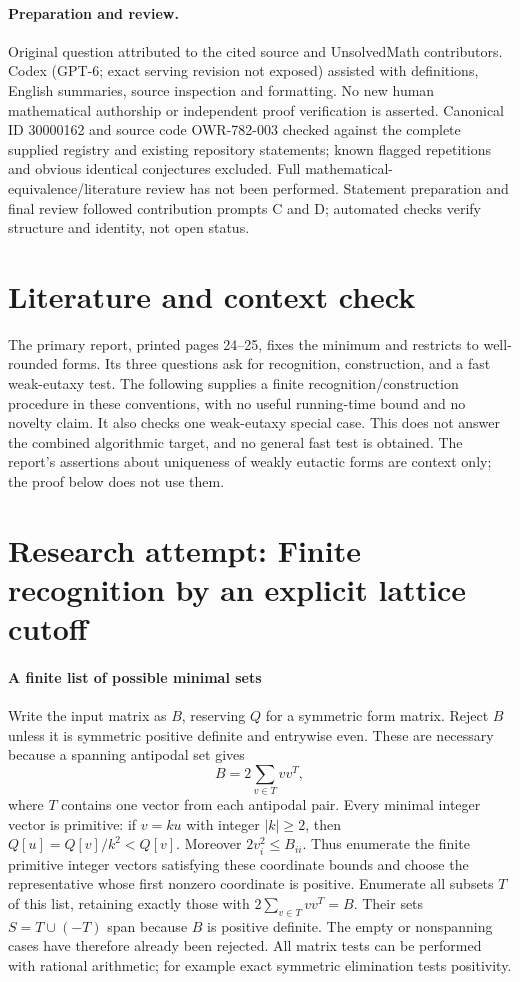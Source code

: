 \documentclass[11pt]{article}
\begin{document}
\paragraph{Preparation and review.}
Original question attributed to the cited source and UnsolvedMath contributors. Codex (GPT-6; exact serving revision not exposed) assisted with definitions, English summaries, source inspection and formatting. No new human mathematical authorship or independent proof verification is asserted. Canonical ID 30000162 and source code OWR-782-003 checked against the complete supplied registry and existing repository statements; known flagged repetitions and obvious identical conjectures excluded. Full mathematical-equivalence/literature review has not been performed. Statement preparation and final review followed contribution prompts C and D; automated checks verify structure and identity, not open status.
\label{end:30000162}

\section{Literature and context check}
The primary report, printed pages 24--25, fixes the minimum and restricts to well-rounded forms. Its three questions ask for recognition, construction, and a fast weak-eutaxy test. The following supplies a finite recognition/construction procedure in these conventions, with no useful running-time bound and no novelty claim. It also checks one weak-eutaxy special case. This does not answer the combined algorithmic target, and no general fast test is obtained. The report's assertions about uniqueness of weakly eutactic forms are context only; the proof below does not use them.
\section{Research attempt: Finite recognition by an explicit lattice cutoff}

\paragraph{A finite list of possible minimal sets}
Write the input matrix as $B$, reserving $Q$ for a symmetric form matrix. Reject $B$ unless it is symmetric positive definite and entrywise even. These are necessary because a spanning antipodal set gives
\[
 B=2\sum_{v\in T}vv^T,
\]
where $T$ contains one vector from each antipodal pair. Every minimal integer vector is primitive: if $v=ku$ with integer $|k|\geq2$, then $Q[u]=Q[v]/k^2<Q[v]$. Moreover $2v_i^2\leq B_{ii}$. Thus enumerate the finite primitive integer vectors satisfying these coordinate bounds and choose the representative whose first nonzero coordinate is positive. Enumerate all subsets $T$ of this list, retaining exactly those with $2\sum_{v\in T}vv^T=B$. Their sets $S=T\cup(-T)$ span because $B$ is positive definite. The empty or nonspanning cases have therefore already been rejected. All matrix tests can be performed with rational arithmetic; for example exact symmetric elimination tests positivity.
\end{document}
